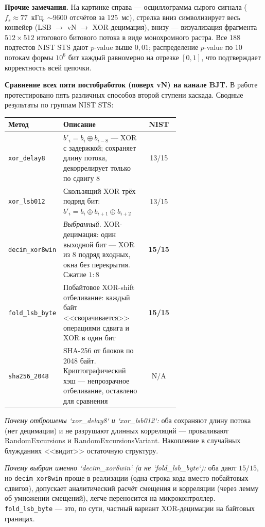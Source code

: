 \documentclass[12pt,a4paper]{extarticle}
\begin{document}
{\medskip
\textbf{Прочие замечания.} На картинке справа --- осциллограмма сырого
сигнала ($f_s\approx 77$~кГц, $\sim 9600$ отсчётов за 125~мс), стрелка
вниз символизирует весь конвейер (LSB $\to$ vN $\to$ XOR-децимация), внизу
--- визуализация фрагмента $512\times 512$ итогового битового потока в виде
монохромного растра. Все 188 подтестов NIST STS дают $p$-value выше
$0{,}01$; распределение $p$-value по 10 потокам формы $10^6$ бит каждый
равномерно на отрезке $[0,1]$, что подтверждает корректность всей цепочки.

\medskip
\textbf{Сравнение всех пяти постобработок (поверх vN) на канале BJT.}
В работе протестировано пять различных способов второй ступени каскада.
Сводные результаты по группам NIST STS:

\smallskip
\begin{tabular}{|p{0.18\linewidth}|p{0.48\linewidth}|c|}
  \hline
  \textbf{Метод} & \textbf{Описание} & \textbf{NIST} \\ \hline
  \texttt{xor\_delay8} &
    $b'_i = b_i \oplus b_{i-8}$ --- XOR с задержкой; сохраняет длину потока,
    декоррелирует только по сдвигу 8 &
    13/15 \\ \hline
  \texttt{xor\_lsb012} &
    Скользящий XOR трёх подряд бит:
    $b'_i = b_i \oplus b_{i+1} \oplus b_{i+2}$ &
    13/15 \\ \hline
  \texttt{decim\_xor8win} &
    \emph{Выбранный.} XOR-децимация: один выходной бит --- XOR из 8 подряд
    входных, окна без перекрытия. Сжатие $1{:}8$ &
    \textbf{15/15} \\ \hline
  \texttt{fold\_lsb\_byte} &
    Побайтовое XOR-shift отбеливание: каждый байт <<сворачивается>>
    операциями сдвига и XOR в один бит &
    \textbf{15/15} \\ \hline
  \texttt{sha256\_2048} &
    SHA-256 от блоков по 2048 байт. Криптографический хэш ---
    непрозрачное отбеливание, оставлено для сравнения &
    N/A \\ \hline
\end{tabular}

\smallskip
\emph{Почему отброшены `xor\_delay8` и `xor\_lsb012`:} оба сохраняют длину
потока (нет децимации) и не разрушают длинных корреляций --- проваливают
RandomExcursions и RandomExcursionsVariant. Накопление в случайных
блужданиях <<видит>> остаточную структуру.

\emph{Почему выбран именно `decim\_xor8win` (а не `fold\_lsb\_byte`):}
оба дают $15/15$, но \texttt{decim\_xor8win} проще в реализации
(одна строка кода вместо побайтовых сдвигов), допускает аналитический расчёт
смещения и корреляции (через лемму об умножении смещений), легче переносится
на микроконтроллер. \texttt{fold\_lsb\_byte} --- это, по сути, частный
вариант XOR-децимации на байтовых границах.

}
\end{document}
